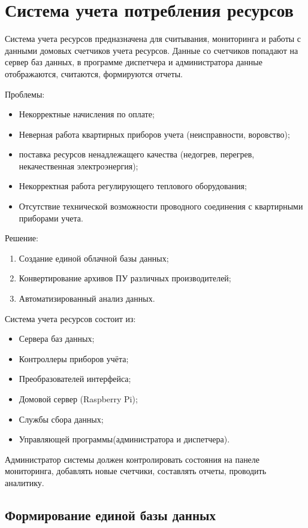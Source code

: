 
\section{Система учета потребления ресурсов}
Система учета ресурсов предназначена для считывания, мониторинга и работы с данными домовых счетчиков учета ресурсов. Данные со счетчиков попадают на сервер баз данных, в программе диспетчера и администратора данные отображаются, считаются, формируются отчеты. \cite{NK}

Проблемы:  
\begin{itemize}
	\item Некорректные начисления по оплате; 
	\item Неверная работа квартирных приборов учета (неисправности, воровство); 
	\item поставка ресурсов ненадлежащего качества (недогрев, перегрев, некачественная электроэнергия);
	\item Некорректная работа регулирующего теплового оборудования; 
	\item Отсутствие технической возможности проводного соединения с квартирными приборами учета.
\end{itemize}

Решение: 
\begin{enumerate}
	\item Создание единой облачной базы данных; 
	\item Конвертирование архивов ПУ различных производителей;
	\item Автоматизированный анализ данных.
\end{enumerate}

Система учета ресурсов состоит из:
\begin{itemize}
	\item Сервера баз данных;
	\item Контроллеры приборов учёта;
	\item Преобразователей интерфейса;
	\item Домовой сервер (Raspberry Pi);
	\item Службы сбора данных;
	\item Управляющей программы(администратора и диспетчера).
\end{itemize}
Администратор системы должен контролировать состояния на панеле мониторинга, добавлять новые счетчики, составлять отчеты, проводить аналитику. 

\subsection{Формирование единой базы данных}

